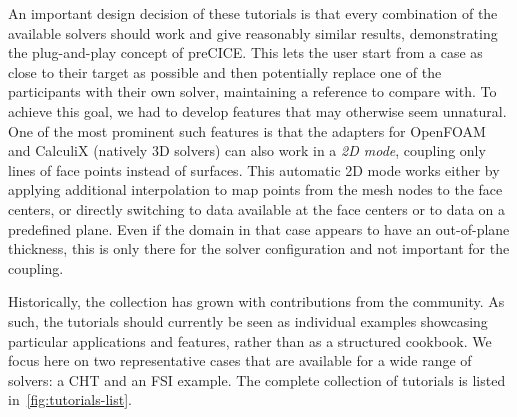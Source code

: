 An important design decision of these tutorials is that every combination of the available solvers should work and give reasonably similar results,
demonstrating the plug-and-play concept of preCICE. This lets the user start from a case as close to their target as possible
and then potentially replace one of the participants with their own solver, maintaining a reference to compare with.
To achieve this goal, we had to develop features that may otherwise seem unnatural.
One of the most prominent such features is that the adapters for OpenFOAM and CalculiX (natively 3D solvers) can also work
in a \emph{2D mode}, coupling only lines of face points instead of surfaces. This automatic 2D mode works either by applying
additional interpolation to map points from the mesh nodes to the face centers, or directly switching to data available at the face centers
or to data on a predefined plane. Even if the domain in that case appears to have an out-of-plane thickness, this is only there
for the solver configuration and not important for the coupling.

Historically, the collection has grown with contributions from the community. As such, the tutorials should currently be seen as individual examples showcasing particular applications and features, rather than as a structured cookbook. We focus here on two representative cases that are available for a wide range of solvers: a CHT and an FSI example. The complete collection of tutorials is listed in~\autoref{fig:tutorials-list}.

